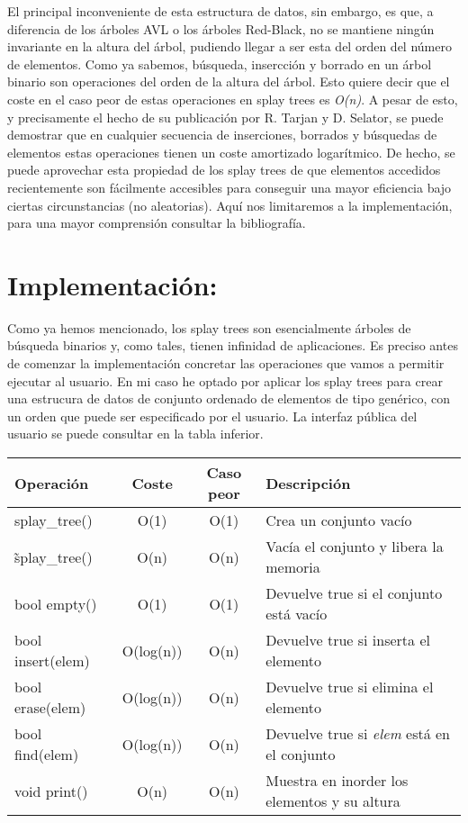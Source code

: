\documentclass[letterpaper,12pt]{article}
\begin{document}
El principal inconveniente de esta estructura de datos, sin embargo, es que, 
a diferencia de los árboles AVL o los árboles Red-Black, no se mantiene 
ningún invariante en la altura del árbol, pudiendo llegar a ser esta del 
orden del número de elementos. Como ya sabemos, búsqueda, insercción y 
borrado en un árbol binario son operaciones del orden de la altura del árbol.
Esto quiere decir que el coste en el caso peor de estas operaciones en splay 
trees es \textit{O(n)}. A pesar de esto, y precisamente el hecho de su 
publicación por R. Tarjan y D. Selator, se puede demostrar que en cualquier 
secuencia de inserciones, borrados y búsquedas de elementos estas operaciones
tienen un coste amortizado logarítmico. De hecho, se puede aprovechar esta 
propiedad de los splay trees de que elementos accedidos recientemente son 
fácilmente accesibles para conseguir una mayor eficiencia bajo ciertas 
circunstancias (no aleatorias). Aquí nos limitaremos a la implementación,
para una mayor comprensión consultar la bibliografía.


\section{Implementación:}

Como ya hemos mencionado, los splay trees son esencialmente árboles de
búsqueda binarios y, como tales, tienen infinidad de aplicaciones. Es preciso
antes de comenzar la implementación concretar las operaciones que vamos a 
permitir ejecutar al usuario. En mi caso he optado por aplicar los splay 
trees para crear una estrucura de datos de conjunto ordenado de elementos de
tipo genérico, con un orden que puede ser especificado por el usuario.
La interfaz pública del usuario se puede consultar en la tabla inferior.

\begin{center}
\begin{tabular}{|l|c|c|l|}

	\hline
	Operación & Coste & Caso peor & Descripción\\
	\hline
    splay\_tree()    & O(1)     &  O(1)& Crea un conjunto vacío\\
	\hline
    \~splay\_tree()  & O(n)     & O(n) & Vacía el conjunto y libera la memoria\\ 
	\hline
	bool empty()     & O(1)     & O(1) & Devuelve true si el conjunto está vacío\\
	\hline
	bool insert(elem)& O(log(n))& O(n) & Devuelve true si inserta el elemento\\
	\hline
	bool erase(elem) & O(log(n))& O(n) & Devuelve true si elimina el elemento\\
	\hline
	bool find(elem)  & O(log(n))& O(n) & Devuelve true si \textit{elem} está en el conjunto\\
	\hline
	void print()     & O(n)     & O(n) & Muestra en inorder los elementos y su altura\\
	\hline
	
\end{tabular}
\end{center}
\end{document}
